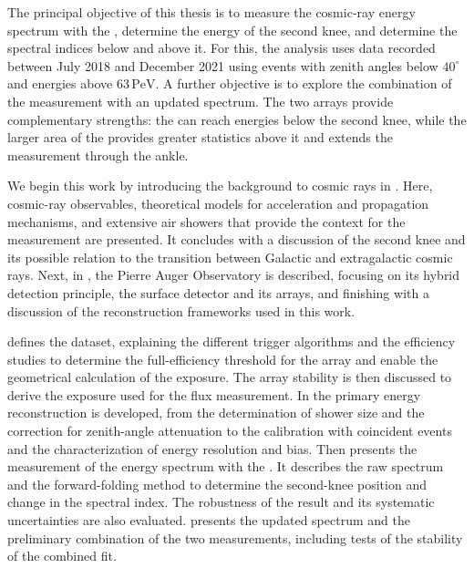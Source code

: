 \documentclass[main.tex]{subfiles}
\begin{document}
The principal objective of this thesis is to measure the cosmic-ray energy spectrum with the , determine the energy of the second knee, and determine the spectral indices below and above it.
For this, the analysis uses data recorded between July 2018 and December 2021 using events with zenith angles below $40^\circ$ and energies above $63\,\mathrm{PeV}$.
A further objective is to explore the combination of the  measurement with an updated  spectrum.
The two arrays provide complementary strengths: the  can reach energies below the second knee, while the larger area of the  provides greater statistics above it and extends the measurement through the ankle.

We begin this work by introducing the background to cosmic rays in .
Here, cosmic-ray observables, theoretical models for acceleration and propagation mechanisms, and extensive air showers that provide the context for the measurement are presented.
It concludes with a discussion of the second knee and its possible relation to the transition between Galactic and extragalactic cosmic rays.
Next, in , the Pierre Auger Observatory is described, focusing on its hybrid detection principle, the surface detector and its arrays, and finishing with a discussion of the reconstruction frameworks used in this work.

 defines the  dataset, explaining the different trigger algorithms and the efficiency studies to determine the full-efficiency threshold for the array and enable the geometrical calculation of the exposure. The array stability is then discussed to derive the exposure used for the flux measurement.
In  the primary energy reconstruction is developed, from the determination of shower size and the correction for zenith-angle attenuation to the calibration with coincident  events and the characterization of energy resolution and bias.
Then  presents the measurement of the energy spectrum with the .
It describes the raw spectrum and the forward-folding method to determine the second-knee position and change in the spectral index.
The robustness of the result and its systematic uncertainties are also evaluated.
 presents the updated  spectrum and the preliminary combination of the two measurements, including tests of the stability of the combined fit.
\end{document}
